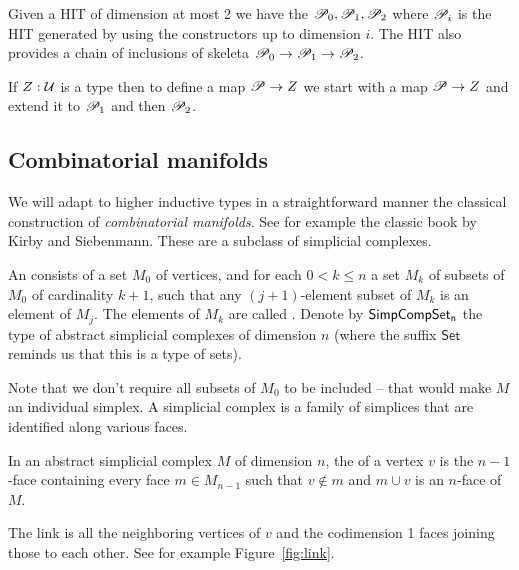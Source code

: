 \begin{mydef}
Given a HIT of dimension at most 2 we have the  \( \P_0,\P_1,\P_2 \) where \( \P_i \) is the HIT generated by using the constructors up to dimension \( i \). The HIT also provides a chain of inclusions of skeleta \( \P_0\to\P_1\to\P_2 \).
\end{mydef}

If \( Z:\uni \) is a type then to define a map \( \P\to Z \) we start with a map \( \P\to Z \) and extend it to \( \P_1 \) and then \( \P_2 \). 

\subsection{Combinatorial manifolds}

We will adapt to higher inductive types in a straightforward manner the classical construction of \emph{combinatorial manifolds}. See for example the classic book by Kirby and Siebenmann\cite{kirby_siebenmann}. These are a subclass of simplicial complexes.

\begin{mydef}
An  consists of a set \( M_0 \) of vertices, and for each \( 0<k\leq n \) a set \( M_k \) of subsets of \( M_0 \) of cardinality \( k+1 \), such that any \( (j+1) \)-element subset of \( M_k \) is an element of \( M_j \). The elements of \( M_k \) are called . Denote by \( \simcomp \) the type of abstract simplicial complexes of dimension \( n \) (where the suffix \( \mathsf{Set} \) reminds us that this is a type of sets).
\end{mydef}

Note that we don't require all subsets of \( M_0 \) to be included -- that would make \( M \) an individual simplex. A simplicial complex is a family of simplices that are identified along various faces.

\begin{mydef}
In an abstract simplicial complex \( M \) of dimension \( n \), the  of a vertex \( v \) is the \( n-1 \)-face containing every face \( m\in M_{n-1} \) such that \( v\notin m \) and \( m\cup v \) is an \( n \)-face of \( M \).
\end{mydef}

The link is all the neighboring vertices of \( v \) and the codimension 1 faces joining those to each other. See for example Figure~\ref{fig:link}.

